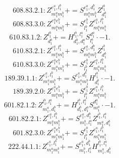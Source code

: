 \documentclass[letterpaper,10pt,fleqn,leqno,onecolumn]{article}
\begin{document}
\begin{equation} \;\;\;\;\;\;  608.83.2.1: Z^{e_{1}^{a},l_{1}^{b}}_{m_{1}^{a}m_{1}^{b}}+=S^{e_{1}^{a},d_{1}^{b}}_{m_{1}^{a}m_{1}^{b}}Z^{l_{1}^{b}}_{d_{1}^{b}} \end{equation}
\begin{equation} \;\;\;\;\;\;  608.83.3.0: Z^{e_{1}^{a}e_{1}^{b}}_{m_{1}^{a}m_{1}^{b}}+=S^{e_{1}^{b}}_{l_{1}^{b}}Z^{e_{1}^{a},l_{1}^{b}}_{m_{1}^{a}m_{1}^{b}} \end{equation}
\begin{equation} \;\;\;\;\;\;  610.83.1.2: Z^{l_{1}^{b}}_{d_{1}^{b}}+=H^{l_{1}^{b},l_{1}^{a}}_{d_{1}^{b},d_{1}^{a}}S^{d_{1}^{a}}_{l_{1}^{a}}\cdot -1. \end{equation}
\begin{equation} \;\;\;\;\;\;  610.83.2.1: Z^{e_{1}^{a},l_{1}^{b}}_{m_{1}^{a}m_{1}^{b}}+=S^{e_{1}^{a},d_{1}^{b}}_{m_{1}^{a}m_{1}^{b}}Z^{l_{1}^{b}}_{d_{1}^{b}} \end{equation}
\begin{equation} \;\;\;\;\;\;  610.83.3.0: Z^{e_{1}^{a}e_{1}^{b}}_{m_{1}^{a}m_{1}^{b}}+=S^{e_{1}^{b}}_{l_{1}^{b}}Z^{e_{1}^{a},l_{1}^{b}}_{m_{1}^{a}m_{1}^{b}} \end{equation}
\begin{equation} \;\;\;\;\;\;  189.39.1.1: Z^{e_{1}^{a},l_{1}^{b}}_{m_{1}^{a}m_{1}^{b}}+=S^{e_{1}^{a},d_{1}^{b}}_{m_{1}^{a}m_{1}^{b}}H^{l_{1}^{b}}_{d_{1}^{b}}\cdot -1. \end{equation}
\begin{equation} \;\;\;\;\;\;  189.39.2.0: Z^{e_{1}^{a}e_{1}^{b}}_{m_{1}^{a}m_{1}^{b}}+=S^{e_{1}^{b}}_{l_{1}^{b}}Z^{e_{1}^{a},l_{1}^{b}}_{m_{1}^{a}m_{1}^{b}} \end{equation}
\begin{equation} \;\;\;\;\;\;  601.82.1.2: Z^{l_{1}^{b},l_{1}^{a}}_{m_{1}^{a},d_{1}^{b}}+=H^{l_{1}^{b},l_{1}^{a}}_{d_{1}^{b},d_{1}^{a}}S^{d_{1}^{a}}_{m_{1}^{a}}\cdot -1. \end{equation}
\begin{equation} \;\;\;\;\;\;  601.82.2.1: Z^{e_{1}^{a},l_{1}^{b}}_{m_{1}^{a}m_{1}^{b}}+=S^{e_{1}^{a},d_{1}^{b}}_{m_{1}^{b},l_{1}^{a}}Z^{l_{1}^{b},l_{1}^{a}}_{m_{1}^{a},d_{1}^{b}} \end{equation}
\begin{equation} \;\;\;\;\;\;  601.82.3.0: Z^{e_{1}^{a}e_{1}^{b}}_{m_{1}^{a}m_{1}^{b}}+=S^{e_{1}^{b}}_{l_{1}^{b}}Z^{e_{1}^{a},l_{1}^{b}}_{m_{1}^{a}m_{1}^{b}} \end{equation}
\begin{equation} \;\;\;\;\;\;  222.44.1.1: Z^{e_{1}^{a},l_{1}^{b}}_{m_{1}^{a}m_{1}^{b}}+=S^{e_{1}^{a},d_{1}^{b}}_{m_{1}^{b},l_{1}^{a}}H^{l_{1}^{b},l_{1}^{a}}_{m_{1}^{a},d_{1}^{b}} \end{equation}
\end{document}
